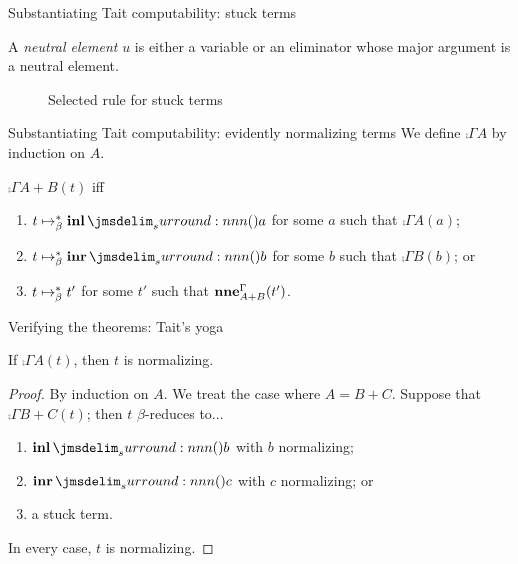 \documentclass{beamer}
\begin{document}
\begin{frame}{Substantiating Tait computability: stuck terms}
  \begin{definition}
    A \emph{neutral element} $u$ is either a variable or an eliminator whose major argument is a neutral element.
  \end{definition}
  \begin{figure}
    \centering
    \begin{mathpar}
    \end{mathpar}
    \caption{Selected rule for stuck terms}
  \end{figure}
\end{frame}

\begin{frame}{Substantiating Tait computability: evidently normalizing terms}
  We define $\comp{\Gamma}{A}$ by induction on $A$.
  \begin{definition}
    $\comp{\Gamma}{A + B}(t)$ iff
    \begin{enumerate}
    \item $t \bRed* \tmInl{a}$ for some $a$ such that $\comp{\Gamma}{A}(a)$;
    \item $t \bRed* \tmInr{b}$ for some $b$ such that $\comp{\Gamma}{B}(b)$; or
    \item $t \bRed* t'$ for some $t'$ such that $\neu{\Gamma}{A + B}(t')$.
    \end{enumerate}
  \end{definition}
\end{frame}

\begin{frame}{Verifying the theorems: Tait's yoga}
  \begin{theorem}
    If $\comp{\Gamma}{A}(t)$, then $t$ is normalizing.
  \end{theorem}
  \begin{proof}
    By induction on $A$.
    We treat the case where $A = B + C$.
    Suppose that $\comp{\Gamma}{B + C}(t)$; then $t$ $\beta$-reduces to...
    \begin{enumerate}
    \item $\tmInl{b}$ with $b$ normalizing;
    \item $\tmInr{c}$ with $c$ normalizing; or
    \item a stuck term.
    \end{enumerate}
    In every case, $t$ is normalizing.
  \end{proof}
\end{frame}
\end{document}
